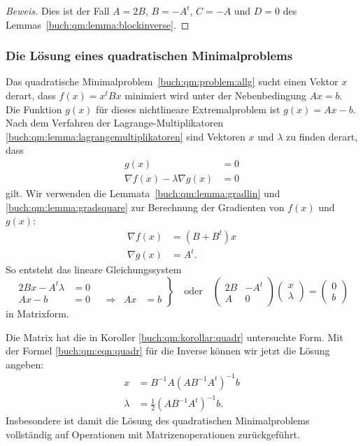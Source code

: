 \begin{proof}[Beweis]
Dies ist der Fall $A=2B$, $B=-A^t$, $C=-A$ und $D=0$ des
Lemmas~\ref{buch:qm:lemma:blockinverse}.
\end{proof}

%
%
\subsubsection{Die Lösung eines quadratischen Minimalproblems}
Das quadratische Minimalproblem~\ref{buch:qm:problem:allg} sucht
einen Vektor $x$ derart, dass $f(x)=x^tBx$ minimiert wird unter der
Nebenbedingung $Ax=b$.
Die Funktion $g(x)$ für dieses nichtlineare Extremalproblem ist
$g(x)=Ax-b$.
Nach dem Verfahren der Lagrange-Multiplikatoren
\ref{buch:qm:lemma:lagrangemultiplikatoren}
sind Vektoren $x$ und $\lambda$ zu finden derart, dass
\begin{align*}
g(x) &= 0
\\
\nabla f(x) -\lambda \nabla g(x) &=0
\end{align*}
gilt.
Wir verwenden die Lemmata~\ref{buch:qm:lemma:gradlin}
und \ref{buch:qm:lemma:gradsquare}
zur Berechnung der Gradienten von $f(x)$ und $g(x)$:
\begin{align*}
\nabla f(x) &= (B+B^t)x
\\
\nabla g(x) &= A^t.
\end{align*}
So entsteht das lineare Gleichungssystem
\[
\left.
\begin{aligned}
2Bx - A^t\lambda &=0
\\
Ax-b&=0 &&\Rightarrow& Ax&=b
\end{aligned}
\right\}
\quad\text{oder}\quad
\begin{pmatrix}
2B & -A^t \\
 A & 0
\end{pmatrix}
\begin{pmatrix}x\\\lambda\end{pmatrix}
=
\begin{pmatrix}0\\ b\end{pmatrix}
\]
in Matrixform.

Die Matrix hat die in Koroller
\ref{buch:qm:korollar:quadr} untersuchte Form.
Mit der Formel \eqref{buch:qm:eqn:quadr} für die Inverse können wir jetzt 
die Lösung angeben:
\begin{align*}
x       &= B^{-1}A(AB^{-1}A^t)^{-1} b \\
\lambda &= \frac12(AB^{-1}A^t)^{-1}b.
\end{align*}
Insbesondere ist damit die Lösung des quadratischen Minimalproblems
vollständig auf Operationen mit Matrizenoperationen zurückgeführt.

